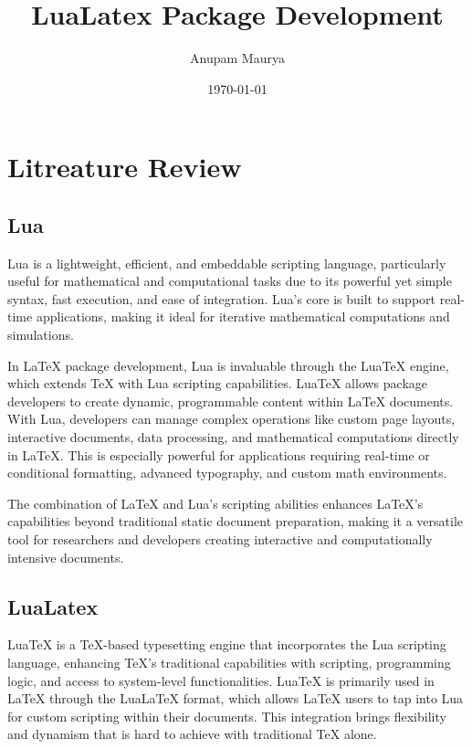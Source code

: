 \documentclass{article}
\begin{document}
\title{LuaLatex Package Development}
\author{Anupam Maurya}
\date{\today}
\maketitle
\tableofcontents
\newpage
\section{Litreature Review}

\subsection{Lua}
Lua is a lightweight, efficient, and embeddable scripting language, particularly useful for mathematical and computational tasks due to its powerful yet simple syntax, fast execution, and ease of integration. Lua's core is built to support real-time applications, making it ideal for iterative mathematical computations and simulations.

In LaTeX package development, Lua is invaluable through the LuaTeX engine, which extends TeX with Lua scripting capabilities. LuaTeX allows package developers to create dynamic, programmable content within LaTeX documents. With Lua, developers can manage complex operations like custom page layouts, interactive documents, data processing, and mathematical computations directly in LaTeX. This is especially powerful for applications requiring real-time or conditional formatting, advanced typography, and custom math environments.

The combination of LaTeX and Lua's scripting abilities enhances LaTeX's capabilities beyond traditional static document preparation, making it a versatile tool for researchers and developers creating interactive and computationally intensive documents.

\subsection{LuaLatex}
LuaTeX is a TeX-based typesetting engine that incorporates the Lua scripting language, enhancing TeX’s traditional capabilities with scripting, programming logic, and access to system-level functionalities. LuaTeX is primarily used in LaTeX through the LuaLaTeX format, which allows LaTeX users to tap into Lua for custom scripting within their documents. This integration brings flexibility and dynamism that is hard to achieve with traditional TeX alone.
\end{document}
